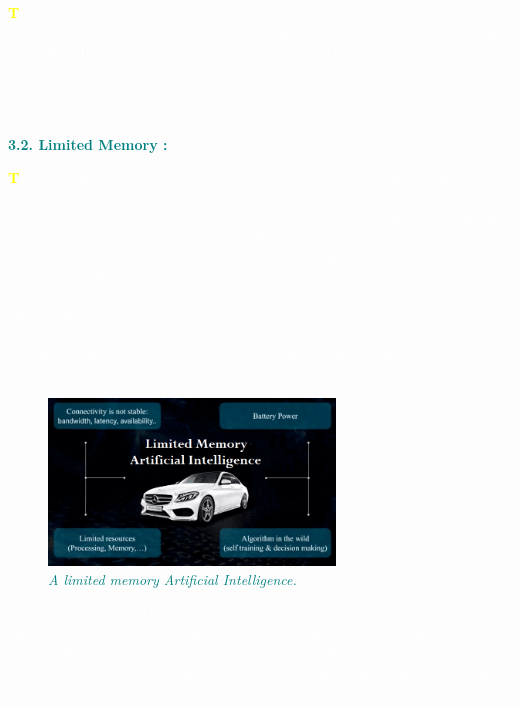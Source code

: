 \documentclass[12pt]{article}
\begin{document}
\textcolor{white}{\textbf{\textcolor{yellow}{\huge T}}he most basic types of AI systems are purely reactive, and have the ability neither to form memories nor to use past experiences to inform current decisions. Deep Blue, IBM’s chess-playing supercomputer, which beat international grandmaster Garry Kasparov in the late 1990s, is the perfect example of this type of machine.}\\\\

\begin{large}
\textbf{\textcolor{teal}{3.2. Limited Memory :}}\\
\end{large}


\textcolor{white}{\textbf{\textcolor{yellow}{\huge T}}his Type II class contains machines can look into the past. Self-driving cars do some of this already. For example, they observe other cars’ speed and direction. That can’t be done in a just one moment, but rather requires identifying specific objects and monitoring them over time.
These observations are added to the self-driving cars’ preprogrammed representations of the world, which also include lane markings, traffic lights and other important elements, like curves in the road. They’re included when the car decides when to change lanes, to avoid cutting off another driver or being hit by a nearby car.
But these simple pieces of information about the past are only transient. They aren’t saved as part of the car’s library of experience it can learn from, the way human drivers compile experience over years behind the wheel.}

\begin{figure}
\centering
\includegraphics[width=3in]{5-Limited-Memory-Artificial-Intelligence}
\caption{\textit{\textcolor{teal}{A limited memory Artificial Intelligence.}}}
\end{figure}

\textcolor{white}{So how can we build AI systems that build full representations, remember their experiences and learn how to handle new situations? Brooks was right in that it is very difficult to do this. My own research into methods inspired by Darwinian evolution can start to make up for human shortcomings by letting the machines build their own representations.}\\
\end{document}
